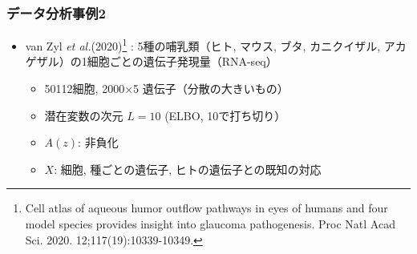 \documentclass[dvipdfmx, dvipsnames]{beamer}
\begin{document}

\begin{frame}
\frametitle{データ分析事例2}
\begin{itemize}
\item van Zyl \textit{et al.}(2020)\footnote{Cell atlas of aqueous humor outflow pathways in eyes of humans and four model species provides insight into glaucoma pathogenesis. Proc Natl Acad Sci. 2020. 12;117(19):10339-10349.} : 5種の哺乳類（ヒト, マウス, ブタ, カニクイザル, アカゲザル）の1細胞ごとの遺伝子発現量（RNA-seq）
\begin{itemize}
\item 50112細胞, 2000$\times$5 遺伝子（分散の大きいもの）
\item 潜在変数の次元 $L=10$  (ELBO, 10で打ち切り）
\item $A(z)$: 非負化
\item $X$: 細胞, 種ごとの遺伝子, ヒトの遺伝子との既知の対応
\end{itemize}
\end{itemize}
\end{frame}
\end{document}
